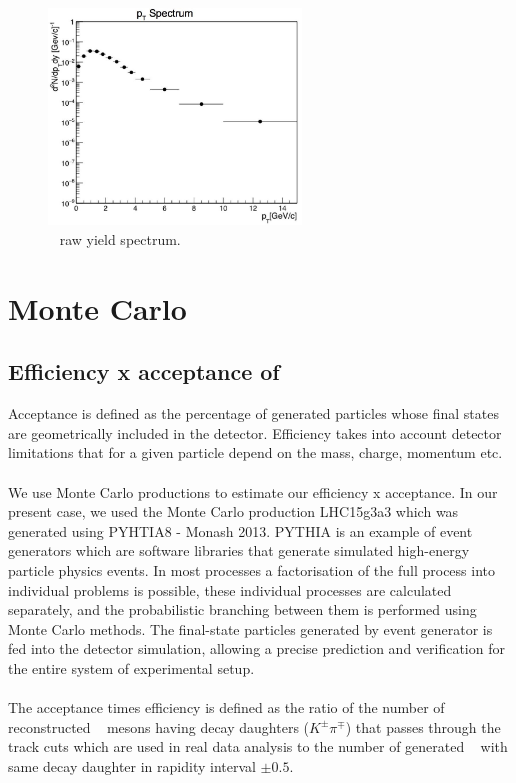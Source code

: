 \begin{figure}[H]
\begin{center}
\includegraphics[width= 0.6\textwidth]{Images/Chapter4/k0ptspectra.jpg}
\caption{\kzero~ raw yield spectrum.}
\label{Fig:chap4-4.7}
\end{center}
\end{figure}



\section{Monte Carlo}
\label{par:4.6}
\subsection{Efficiency x acceptance of \kzero}
\label{par:4.6a}
Acceptance is defined as the percentage of generated particles whose final states are geometrically included in the detector. Efficiency takes into account detector limitations that for a given particle depend on the mass, charge, momentum etc. \\
\\
We use Monte Carlo productions to estimate our efficiency x acceptance. In our present case, we used the Monte Carlo production LHC15g3a3 which was generated using PYHTIA8 - Monash 2013. PYTHIA is an example of event generators which are software libraries that generate simulated high-energy particle physics events. In most processes a factorisation of the full process into individual problems is possible, these individual processes are calculated separately, and the probabilistic branching between them is performed using Monte Carlo methods. The final-state particles generated by event generator is fed into the detector simulation, allowing a precise prediction and verification for the entire system of experimental setup. 
\\
\\
The acceptance times efficiency is defined as the ratio of the number of reconstructed \kzero~ mesons having decay daughters ($K^{\pm}\pi^{\mp}$) that passes through the track cuts which are used in real data analysis to the number of generated \kzero~ with same decay daughter in rapidity interval $\pm 0.5$.


